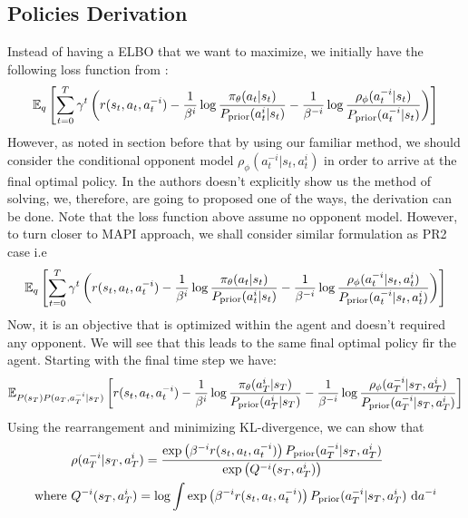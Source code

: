 \label{sec:chap3-balancing-Q}

\subsection{Policies Derivation}
\label{sec:chap3-balancing-Q-derivation}
Instead of having a ELBO that we want to maximize, we initially have the following loss function from \cite{grau2018balancing}:
\begin{equation}
    \mathbb{E}_q\left[ \sum^T_{t=0} \gamma^t \left( r(s_t, a_t, a^{-i}_t) - \frac{1}{\beta^i} \log\frac{\pi_{\theta}(a_t|s_t)}{P_{\text{prior}}(a^i_t|s_t)} - \frac{1}{\beta^{-i}}\log \frac{\rho_\phi(a^{-i}_t|s_t)}{P_{\text{prior}}(a^{-i}_t|s_t)} \right) \right]
\end{equation}
However, as noted in section before that by using our familiar method, we should consider the conditional opponent model $\rho_\phi(a^{-i}_t | s_t, a^i_t)$ in order to arrive at the final optimal policy. In \cite{grau2018balancing} the authors doesn't explicitly show us the method of solving, we, therefore, are going to proposed one of the ways, the derivation can be done. Note that the loss function above assume no opponent model. However, to turn closer to MAPI approach, we shall consider similar formulation as PR2 \cite{wen2019probabilistic} case i.e 
\begin{equation}
    \mathbb{E}_q\left[ \sum^T_{t=0} \gamma^t \left( r(s_t, a_t, a^{-i}_t) - \frac{1}{\beta^i} \log\frac{\pi_{\theta}(a_t|s_t)}{P_{\text{prior}}(a^i_t|s_t)} - \frac{1}{\beta^{-i}}\log \frac{\rho_\phi(a^{-i}_t | s_t, a^i_t)}{P_{\text{prior}}(a^{-i}_t | s_t, a^i_t)} \right) \right]
\end{equation}
Now, it is an objective that is optimized within the agent and doesn't required any opponent. We will see that this leads to the same final optimal policy fir the agent. Starting with the final time step we have:
\begin{equation}
    \mathbb{E}_{P(s_T) P(a_T, a^{-i}_T | s_T)}\left[ r(s_t, a_t, a^{-i}_t) - \frac{1}{\beta^i} \log\frac{\pi_{\theta}(a^i_T|s_T)}{P_{\text{prior}}(a^i_T|s_T)} - \frac{1}{\beta^{-i}}\log \frac{\rho_\phi(a^{-i}_T|s_T, a^i_T)}{P_{\text{prior}}(a^{-i}_T|s_T, a^i_T)} \right]
\end{equation}
Using the rearrangement and minimizing KL-divergence, we can show that
\begin{equation}
\begin{aligned}
    &\rho(a^{-i}_T | s_T, a^i_T) = \frac{ \exp\left( \beta^{-i} r(s_t, a_t, a^{-i}_t) \right) P_{\text{prior}}(a^{-i}_T|s_T, a^i_T)}{\exp\left( Q^{-i}(s_T, a^{i}_T) \right)}\\
    \text{where }& Q^{-i}(s_T, a^{i}_T) = \log \int \exp\left( \beta^{-i} r(s_t, a_t, a^{-i}_t) \right) P_{\text{prior}}(a^{-i}_T|s_T, a^i_T) \ \mathrm{d} a^{-i}
\end{aligned}
\end{equation}
